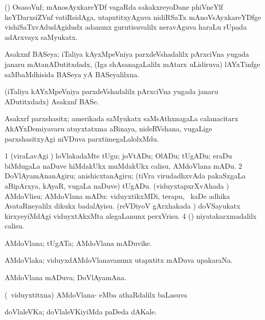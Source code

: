 \bentry
{}
\gl{\nA}
\bmng
(\ravi) OsasoVnf; mAnosAyxkareYDf vagaRda sakakxreyoDane phiVneYlf heYDarxsiZVnf vatiRsidAga, utapxtitxyAguva nidiRSaTx mAnoVsAyxkareYDfge vishiSaTxvAdudAgidudx adanunx gurutisuvalilx neravAguva haraLu rUpada adArxvayx saMyukatx. 
\emng
\eentry

\bentry
{}
\gl{\gu}
\bmng
Asakxnf BASeya; iTaliya kAyxMpeVniya parxdeVshadalilx pArxciVna yugada janaru mAtanADutitxdadx, (Iga shAsanagaLalilx mAtarx uLidiruva) lAYxTinfge saMbaMdhisida BASeya yA BASeyalilxna. 
\emng
\eentry

\bentry
{}
\gl{\nA}
\bmng
(iTaliya kAYxMpeVniya parxdeVshadalilx pArxciVna yugada janaru ADutitxdadx) Asakxnf BASe. 
\emng
\eentry

\bentry
{}
\gl{\nA}
\bmng
Asakxrf parxshasitx; amerikada saMyukatx saMsAthxnagaLa calanacitarx AkAYxDemiyavaru atuyxtatxma aBinaya, nideRVshana, \mo vugaLige parxshasitxyAgi niVDuva parxtimegaLalolxMdu. 
\emng
\eentry

\bentry
{}
\gl{\akirx}
\bmng
\bnum
\num{1} (viraLavAgi \sakirx) loVlakadaMte tUgu; joVtADu; OlADu; tUgADu; eraDu biMdugaLa naDuve hiMdakUkx muMdakUkx calisu, AMdoVlana mADu. 
\num{2} DoVlAyamAnanAgiru; anishicxtanAgiru; (tiVra virudadhxvAda pakaSxgaLa aBipArxya, kAyaR, \mo vugaLa naDuve) tUgADu. 
 (viduyxtapxrXvAhada \vi) AMdoVlisu; AMdoVlana mADu: 
\banum
{} viduyxtikxMDi, terapu, \mo\ kaDe adhika AvataRneyalilx dikukx badalAyisu. 
 (reVDiyoV gArxhakada \vi) doVSayukatx kirxyeyiMdAgi viduyxtAkxMta alegaLanunx perxVrisu. 
\eanum
\numie
\num{4} (\Bwvi) niyatakarxmadalilx calisu. 
\enum
\emng
\eentry

\bentry
{}
\gl{\nA}
\bmng
AMdoVlana; tUgATa; AMdoVlana mADuvike. 
\emng
\eentry

\bentry
{}
\gl{\nA}
\bmng
AMdoVlaka; viduyxdAMdoVlanavanunx utapxtitx mADuva upakaraNa. 
\emng
\eentry

\bentry
{}
\gl{\gu}
\bmng
AMdoVlana mADuva; DoVlAyamAna. 
\emng
\eentry

\bentry
{}
\gl{\sapUpa}
\bmng
(\kanmu\ viduyxtitxna) AMdoVlana- eMba athaRdalilx baLasuva \sapUpa 
\emng
\eentry

\bentry
{}
\gl{\nA}
\bmng
doVlaleVKa; doVlaleVKiyiMda paDeda dAKale. 
\emng
\eentry

